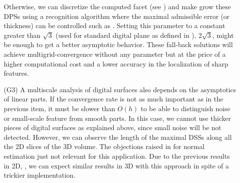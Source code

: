 \begin{enumerate}
Otherwise, we can discretize the computed facet (see ) and make grow these
DPSs using a recognition algorithm where the maximal admissible error (or thickness) can
be controlled such as \cite{Charrier2008}. Setting this parameter to a constant greater
than $\sqrt{3}$ (used for standard digital plane as defined in ),
\eg $2\sqrt{3}$, might be enough to get a better asymptotic behavior. These fall-back
solutions will achieve multigrid-convergence without any parameter but at the price of
a higher computational cost and a lower accuracy in the localization of sharp features. 
\item[(G3)]
A multiscale analysis of digital surfaces also depends on the asymptotics of linear parts.
If the convergence rate is not as much important as in the previous item, it must be slower
than $O(h)$ to be able to distinguish noise or small-scale feature from smooth parts.
In this case, we cannot use thicker pieces of digital surfaces as explained above, since
small noise will be not detected. However, we can observe the length of the maximal DSSs
along all the 2D slices of the 3D volume. The objections raised in  for
normal estimation just not relevant for this application. Due to the previous results in 2D,
\cite{Kerautret2012}, we can expect similar results in 3D with this approach in spite of a
trickier implementation.  
\end{enumerate}
